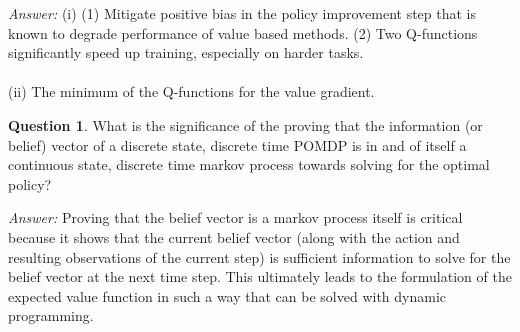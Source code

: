 \documentclass{article}
\theoremstyle{definition}
\newtheorem{question}[thm]{Question}
\newenvironment{answer}{\noindent\textit{Answer:}}{}
\begin{document}
\begin{answer}
(i) (1) Mitigate positive bias in the policy improvement step that is known to degrade performance of value based methods. (2) Two Q-functions significantly speed up training, especially on harder tasks. \\\\
(ii) The minimum of the Q-functions for the value gradient. \\
\end{answer}

\begin{question}
What is the significance of the proving that the information (or belief) vector of a discrete state, discrete time POMDP is in and of itself a continuous state, discrete time markov process towards solving for the optimal policy?
\end{question}

\begin{answer}
Proving that the belief vector is a markov process itself is critical because it shows that the current belief vector (along with the action and resulting observations of the current step) is sufficient information to solve for the belief vector at the next time step. This ultimately leads to the formulation of the expected value function in such a way that can be solved with dynamic programming.
\end{answer}
\end{document}
